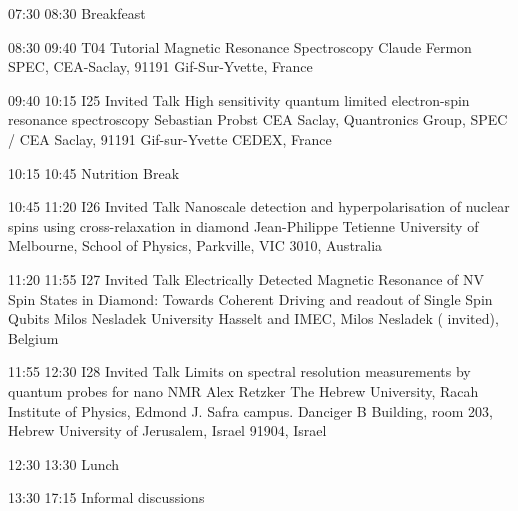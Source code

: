 \begin{confbreak}
{07:30}
{08:30}
{Breakfeast}
\end{confbreak}

 

\begin{talk}
{08:30}
{09:40}
{T04}
{Tutorial}
{Magnetic Resonance Spectroscopy}
{Claude Fermon}
{SPEC, CEA-Saclay, 91191 Gif-Sur-Yvette, France}
\end{talk}

\begin{talk}
{09:40}
{10:15}
{I25}
{Invited Talk}
{High sensitivity quantum limited electron-spin resonance spectroscopy}
{Sebastian Probst}
{CEA Saclay, Quantronics Group, SPEC / CEA Saclay, 91191 Gif-sur-Yvette CEDEX, France}
\end{talk}

\begin{confbreak}
{10:15}
{10:45}
{Nutrition Break}
\end{confbreak}

\begin{talk}
{10:45}
{11:20}
{I26}
{Invited Talk}
{Nanoscale detection and hyperpolarisation of nuclear spins using cross-relaxation in diamond}
{Jean-Philippe Tetienne}
{University of Melbourne, School of Physics, Parkville, VIC 3010, Australia}
\end{talk}

\begin{talk}
{11:20}
{11:55}
{I27}
{Invited Talk}
{Electrically Detected Magnetic Resonance of NV Spin States in Diamond: Towards Coherent Driving and readout of Single Spin Qubits}
{Milos Nesladek}
{University Hasselt and IMEC, Milos Nesladek ( invited), Belgium}
\end{talk}

\begin{talk}
{11:55}
{12:30}
{I28}
{Invited Talk}
{Limits on spectral resolution measurements by quantum probes for nano NMR}
{Alex Retzker}
{The Hebrew University, Racah Institute of Physics, Edmond J. Safra campus. Danciger B Building, room 203, Hebrew University of Jerusalem, Israel 91904, Israel}
\end{talk}

\begin{confbreak}
{12:30}
{13:30}
{Lunch}
\end{confbreak}

\begin{confbreak}
{13:30}
{17:15}
{Informal discussions}
\end{confbreak}

